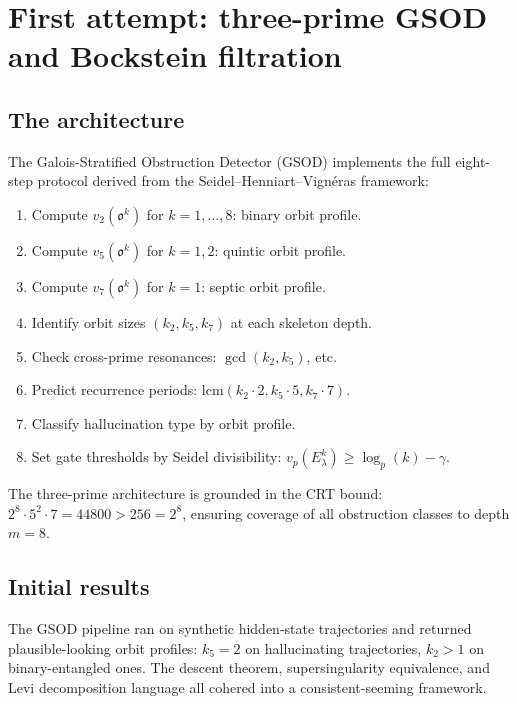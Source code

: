 \documentclass[11pt]{amsart}
\theoremstyle{definition}
\begin{document}
\section{First attempt: three-prime GSOD and Bockstein filtration}
\label{sec:gsod}

\subsection{The architecture}

The Galois-Stratified Obstruction Detector (GSOD) implements the full
eight-step protocol derived from the Seidel--Henniart--Vign\'eras framework:

\begin{enumerate}[label=\textbf{Step \arabic*.}]
\item Compute $v_2(\mathfrak{o}^k)$ for $k = 1, \ldots, 8$: binary orbit profile.
\item Compute $v_5(\mathfrak{o}^k)$ for $k = 1, 2$: quintic orbit profile.
\item Compute $v_7(\mathfrak{o}^k)$ for $k = 1$: septic orbit profile.
\item Identify orbit sizes $(k_2, k_5, k_7)$ at each skeleton depth.
\item Check cross-prime resonances: $\gcd(k_2, k_5)$, etc.
\item Predict recurrence periods: $\mathrm{lcm}(k_2 \cdot 2, k_5 \cdot 5, k_7 \cdot 7)$.
\item Classify hallucination type by orbit profile.
\item Set gate thresholds by Seidel divisibility: $v_p(E_\lambda^k) \geq \log_p(k) - \gamma$.
\end{enumerate}

The three-prime architecture is grounded in the CRT bound:
$2^8 \cdot 5^2 \cdot 7 = 44800 > 256 = 2^8$,
ensuring coverage of all obstruction classes to depth $m=8$.

\subsection{Initial results}

The GSOD pipeline ran on synthetic hidden-state trajectories and returned
plausible-looking orbit profiles: $k_5 = 2$ on hallucinating trajectories,
$k_2 > 1$ on binary-entangled ones.
The descent theorem, supersingularity equivalence, and Levi decomposition
language all cohered into a consistent-seeming framework.
\end{document}
